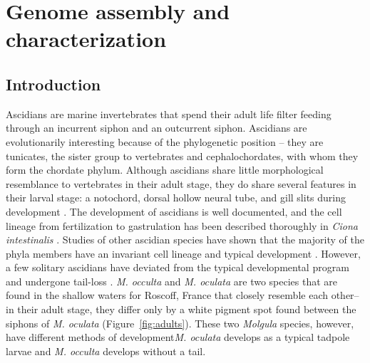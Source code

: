 \chapter{Genome assembly and characterization}
\section{Introduction}
Ascidians are marine invertebrates that spend their adult life filter feeding through an incurrent siphon and an outcurrent siphon. Ascidians are evolutionarily interesting because of the phylogenetic position -- they are tunicates, the sister group to vertebrates and cephalochordates, with whom they form the chordate phylum. Although ascidians share little morphological resemblance to vertebrates in their adult stage, they do share several features in their larval stage: a notochord, dorsal hollow neural tube, and gill slits during development \cite{wada_details_1994,cameron_evolution_2000}. The development of ascidians is well documented, and the cell lineage from fertilization to gastrulation has been described thoroughly in \textit{Ciona intestinalis} \cite{nishida_cell_1983,nishida_cell_1985,nishida_cell_1987}. Studies of other ascidian species have shown that the majority of the phyla members have an invariant cell lineage and typical development \cite{berrill_studies_1931}. However, a few solitary ascidians have deviated from the typical developmental program and undergone tail-loss \cite{swalla_interspecific_1990, tsagkogeorga_updated_2009}. \textit{M. occulta} and \textit{M. oculata} are two species that are found in the shallow waters for Roscoff, France that closely resemble each other-- in their adult stage, they differ only by a white pigment spot found between the siphons of \textit{M. oculata} (Figure~\ref{fig:adults}). These two \textit{Molgula} species, however, have different methods of development\textemdash \textit{M. oculata} develops as a typical tadpole larvae and \textit{M. occulta} develops without a tail. 

